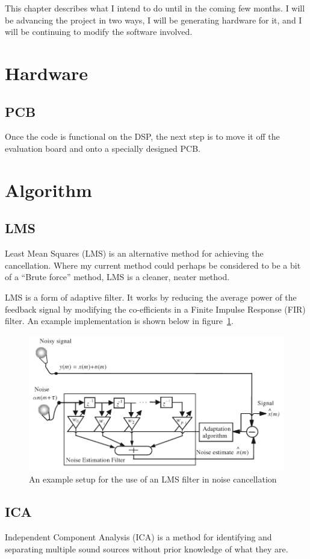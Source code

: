 This chapter describes what I intend to do until in the coming few months.
I will be advancing the project in two ways, I will be generating hardware for it, and I will be continuing to modify the software involved.

\section{Hardware}
\subsection{PCB}
Once the code is functional on the DSP, the next step is to move it off the evaluation board and onto a specially designed PCB.

\section{Algorithm}
\subsection{LMS}
Least Mean Squares (LMS) is an alternative method for achieving the cancellation.
Where my current method could perhaps be considered to be a bit of a ``Brute force'' method, LMS is a cleaner, neater method.

LMS is a form of adaptive filter.
It works by reducing the average power of the feedback signal by modifying the co-efficients in a Finite Impulse Response (FIR) filter.
An example implementation is shown below in figure~\ref{fig:lmsfilter}.

\begin{figure}
	\centering
	\includegraphics{./img/lmsfilter.png}
	\caption{An example setup for the use of an LMS filter in noise cancellation \cite{AdvancedDSPing}}
	\label{fig:lmsfilter}
\end{figure}

\subsection{ICA}
Independent Component Analysis (ICA) is a method for identifying and separating multiple sound sources without prior knowledge of what they are.

